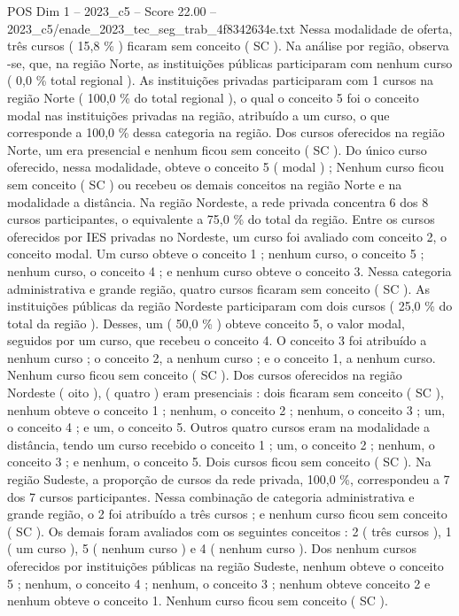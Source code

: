 \begin{textsample}{POS Dim 1 – 2023\_c5 – Score 22.00 – 2023\_c5/enade\_2023\_tec\_seg\_trab\_4f8342634e.txt}
Nessa modalidade de oferta, três cursos ( 15,8 \% ) ficaram sem conceito ( SC ).
Na análise por região, observa -se, que, na região Norte, as instituições públicas participaram com nenhum curso ( 0,0 \% total regional ).
As instituições privadas participaram com 1 cursos na região Norte ( 100,0 \% do total regional ), o qual o conceito 5 foi o conceito modal nas instituições privadas na região, atribuído a um curso, o que corresponde a 100,0 \% dessa categoria na região.
Dos cursos oferecidos na região Norte, um era presencial e nenhum ficou sem conceito ( SC ).
Do único curso oferecido, nessa modalidade, obteve o conceito 5 ( modal ) ; Nenhum curso ficou sem conceito ( SC ) ou recebeu os demais conceitos na região Norte e na modalidade a distância.
Na região Nordeste, a rede privada concentra 6 dos 8 cursos participantes, o equivalente a 75,0 \% do total da região.
Entre os cursos oferecidos por IES privadas no Nordeste, um curso foi avaliado com conceito 2, o conceito modal.
Um curso obteve o conceito 1 ; nenhum curso, o conceito 5 ; nenhum curso, o conceito 4 ; e nenhum curso obteve o conceito 3.
Nessa categoria administrativa e grande região, quatro cursos ficaram sem conceito ( SC ).
As instituições públicas da região Nordeste participaram com dois cursos ( 25,0 \% do total da região ).
Desses, um ( 50,0 \% ) obteve conceito 5, o valor modal, seguidos por um curso, que recebeu o conceito 4.
O conceito 3 foi atribuído a nenhum curso ; o conceito 2, a nenhum curso ; e o conceito 1, a nenhum curso.
Nenhum curso ficou sem conceito ( SC ).
Dos cursos oferecidos na região Nordeste ( oito ), ( quatro ) eram presenciais : dois ficaram sem conceito ( SC ), nenhum obteve o conceito 1 ; nenhum, o conceito 2 ; nenhum, o conceito 3 ; um, o conceito 4 ; e um, o conceito 5.
Outros quatro cursos eram na modalidade a distância, tendo um curso recebido o conceito 1 ; um, o conceito 2 ; nenhum, o conceito 3 ; e nenhum, o conceito 5.
Dois cursos ficou sem conceito ( SC ).
Na região Sudeste, a proporção de cursos da rede privada, 100,0 \%, correspondeu a 7 dos 7 cursos participantes.
Nessa combinação de categoria administrativa e grande região, o 2 foi atribuído a três cursos ; e nenhum curso ficou sem conceito ( SC ).
Os demais foram avaliados com os seguintes conceitos : 2 ( três cursos ), 1 ( um curso ), 5 ( nenhum curso ) e 4 ( nenhum curso ).
Dos nenhum cursos oferecidos por instituições públicas na região Sudeste, nenhum obteve o conceito 5 ; nenhum, o conceito 4 ; nenhum, o conceito 3 ; nenhum obteve conceito 2 e nenhum obteve o conceito 1.
Nenhum curso ficou sem conceito ( SC ).

\end{textsample}
